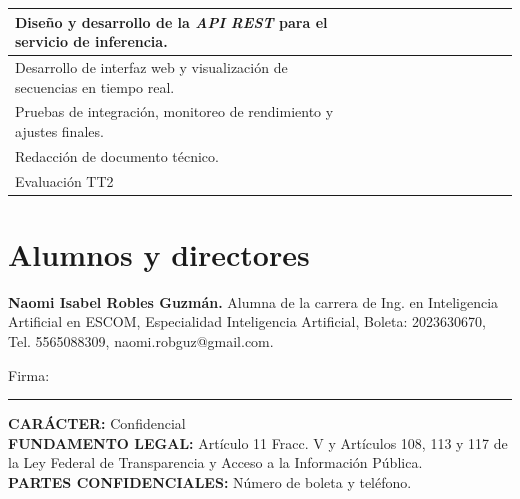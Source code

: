 \documentclass[10pt,letterpaper]{article}
\begin{document}
\begin{table}[H]
\begin{tabular}{|p{5.5cm}|c|c|c|c|c|c|c|c|c|c|c|}
Diseño y desarrollo de la \textit{API REST} para el servicio de inferencia. & & & & & & & & & \cellcolor{gris30} & \cellcolor{gris30} & \\ \hline

Desarrollo de interfaz web y visualización de secuencias en tiempo real. & & & & & & & & & & \cellcolor{gris30} & \cellcolor{gris30} \\ \hline

Pruebas de integración, monitoreo de rendimiento y ajustes finales. & & & & & & & & & & & \cellcolor{gris30} \\ \hline

Redacción de documento técnico. & & & \cellcolor{gris30} & \cellcolor{gris30} & \cellcolor{gris30} & \cellcolor{gris30} & \cellcolor{gris30} & \cellcolor{gris30} & \cellcolor{gris30} & \cellcolor{gris30} & \\ \hline

Evaluación TT2 & & & & & & & & & & \cellcolor{gris30} & \cellcolor{gris30} \\ \hline
\end{tabular}
\end{table}


\newpage
\begin{minipage}[t]{0.95\textwidth}
    \printbibliography[title={7. Referencias}]
\end{minipage}


\newpage
\section{Alumnos y directores}

\begin{minipage}[t]{0.52\textwidth}
    \textbf{Naomi Isabel Robles Guzmán.} Alumna de la carrera de Ing. en Inteligencia Artificial en ESCOM, Especialidad Inteligencia Artificial, Boleta: 2023630670, Tel. 5565088309, naomi.robguz@gmail.com. 
    
    \vspace{0.8cm}
    Firma: \rule{5cm}{0.4pt} 
\end{minipage}
\hfill
\begin{minipage}[t]{0.42\textwidth}
    \vspace{-0.5cm} %
    \begin{tcolorbox}[
        enhanced,
        sharp corners,
        colback=gray!30, %
        colframe=black,
        boxrule=0.5pt,
        left=2pt, right=2pt, top=5pt, bottom=5pt,
        width=\textwidth,
        align=center
    ]
        \fontsize{8}{10}\selectfont
        \textbf{CARÁCTER:} Confidencial  \\
        \textbf{FUNDAMENTO LEGAL:} Artículo 11 Fracc. V y Artículos 108, 113 y 117 de la Ley Federal de Transparencia y Acceso a la Información Pública. \\
        \textbf{PARTES CONFIDENCIALES:} Número de boleta y teléfono.
    \end{tcolorbox}
\end{minipage}
\end{document}
